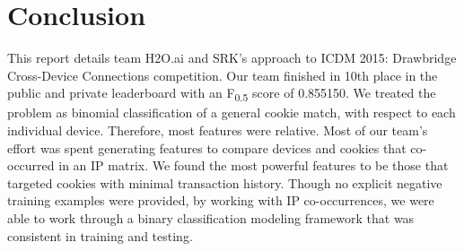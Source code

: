 \documentclass[9pt, journal]{IEEEtran}
\begin{document}
%






\section{Conclusion}

This report details team H2O.ai and SRK's approach to ICDM 2015: Drawbridge Cross-Device Connections competition. 
Our team finished in 10th place in the public and private leaderboard with an F\textsubscript{0.5} score of 0.855150. 
We treated the problem as binomial classification of a general cookie match, with respect to each individual device. 
Therefore, most features were relative. 
Most of our team's effort was spent generating features to compare devices and cookies that co-occurred in an IP matrix.
We found the most powerful features to be those that targeted cookies with minimal transaction history.
Though no explicit negative training examples were provided, by working with IP co-occurrences, we were able to work through a binary classification modeling framework that was consistent in training and testing.
\end{document}
